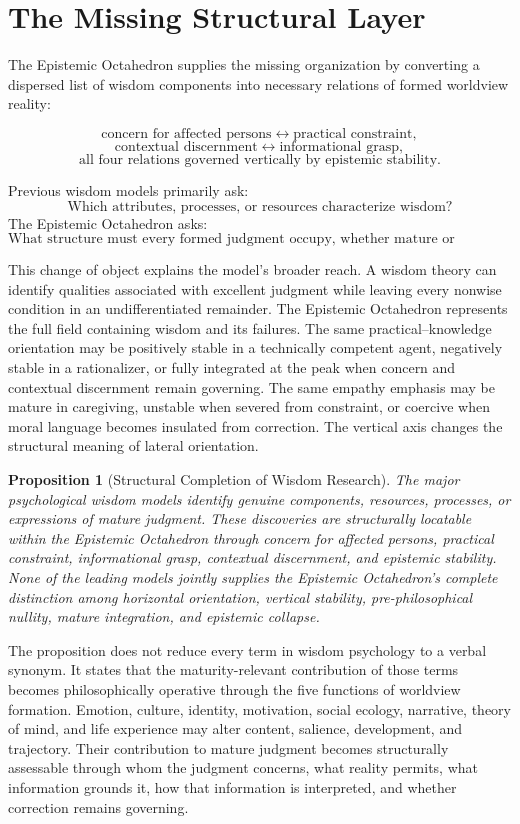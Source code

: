 \documentclass[11pt]{article}
\newtheorem{proposition}{Proposition}
\begin{document}
\section{The Missing Structural Layer}

The Epistemic Octahedron supplies the missing organization by converting a dispersed list of wisdom components into necessary relations of formed worldview reality:

\[
\text{concern for affected persons}\longleftrightarrow\text{practical constraint},
\]
\[
\text{contextual discernment}\longleftrightarrow\text{informational grasp},
\]
\[
\text{all four relations governed vertically by epistemic stability}.
\]

Previous wisdom models primarily ask:
\[
\text{Which attributes, processes, or resources characterize wisdom?}
\]
The Epistemic Octahedron asks:
\[
\text{What structure must every formed judgment occupy, whether mature or distorted?}
\]

This change of object explains the model's broader reach. A wisdom theory can identify qualities associated with excellent judgment while leaving every nonwise condition in an undifferentiated remainder. The Epistemic Octahedron represents the full field containing wisdom and its failures. The same practical--knowledge orientation may be positively stable in a technically competent agent, negatively stable in a rationalizer, or fully integrated at the peak when concern and contextual discernment remain governing. The same empathy emphasis may be mature in caregiving, unstable when severed from constraint, or coercive when moral language becomes insulated from correction. The vertical axis changes the structural meaning of lateral orientation.

\begin{proposition}[Structural Completion of Wisdom Research]
The major psychological wisdom models identify genuine components, resources, processes, or expressions of mature judgment. These discoveries are structurally locatable within the Epistemic Octahedron through concern for affected persons, practical constraint, informational grasp, contextual discernment, and epistemic stability. None of the leading models jointly supplies the Epistemic Octahedron's complete distinction among horizontal orientation, vertical stability, pre-philosophical nullity, mature integration, and epistemic collapse.
\end{proposition}

The proposition does not reduce every term in wisdom psychology to a verbal synonym. It states that the maturity-relevant contribution of those terms becomes philosophically operative through the five functions of worldview formation. Emotion, culture, identity, motivation, social ecology, narrative, theory of mind, and life experience may alter content, salience, development, and trajectory. Their contribution to mature judgment becomes structurally assessable through whom the judgment concerns, what reality permits, what information grounds it, how that information is interpreted, and whether correction remains governing.
\end{document}
